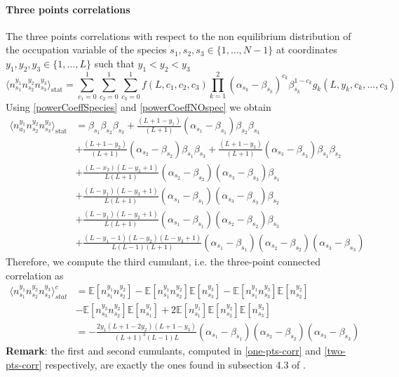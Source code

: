 \documentclass[10pt]{article}
\numberwithin{equation}{section}
\numberwithin{equation}{subsection}
\begin{document}
\paragraph{Three points correlations}
The three points correlations with respect to the non equilibrium distribution of the occupation variable of the species $s_{1},s_{2},s_{3}\in \{1,\ldots,N-1\}$ at coordinates $y_{1},y_{2},y_{3}\in \{1,\ldots,L\}$ such that $y_{1}<y_{2}<y_{3}$
\begin{equation}
    \langle n_{s_{1}}^{y_{1}}n_{s_{2}}^{y_{2}}n_{s_{3}}^{y_{3}}\rangle_{\text{stat}}=\sum_{c_{1}=0}^{1}\sum_{c_{2}=0}^{1}\sum_{c_{3}=0}^{1}f(L,c_{1},c_{2},c_{3})\prod_{k=1}^{2}(\alpha_{s_{k}}-\beta_{s_{k}})^{c_{k}}\beta_{s_{k}}^{1-c_{k}}g_{k}(L,y_{k},c_{k},\ldots,c_{3})
\end{equation}
Using \eqref{powerCoeffSpecies} and \eqref{powerCoeffNOspec} we obtain 
\begin{align}\label{three-pts-corr}
        \langle n_{a_{1}}^{y_{1}}n_{s_{2}}^{y_{2}}n_{s_{3}}^{y_{3}}\rangle_{\text{stat}}&=\beta_{s_{1}}\beta_{s_{2}}\beta_{s_{3}}+\frac{(L+1-y_{1})}{(L+1)}(\alpha_{s_{1}}-\beta_{s_{1}})\beta_{s_{2}}\beta_{s_{3}}
        \\&+\nonumber
        \frac{(L+1-y_{2})}{(L+1)}(\alpha_{s_{2}}-\beta_{s_{2}})\beta_{s_{1}}\beta_{s_{3}}+\frac{(L+1-y_{3})}{(L+1)}(\alpha_{s_{3}}-\beta_{s_{3}})\beta_{s_{1}}\beta_{s_{2}}
        \\&+\nonumber
        \frac{(L-x_{2})(L-y_{3}+1)}{L(L+1)}(\alpha_{s_{2}}-\beta_{s_{2}})(\alpha_{s_{3}}-\beta_{s_{3}})\beta_{s_{1}}
        \\&+\nonumber
        \frac{(L-y_{1})(L-y_{3}+1)}{L(L+1)}(\alpha_{s_{1}}-\beta_{s_{1}})(\alpha_{s_{3}}-\beta_{s_{3}})\beta_{s_{2}}
        \\&+\nonumber
        \frac{(L-y_{1})(L-y_{2}+1)}{L(L+1)}(\alpha_{s_{1}}-\beta_{s_{1}})(\alpha_{s_{2}}-\beta_{s_{2}})\beta_{s_{3}}
        \\&+\nonumber
        \frac{(L-y_{1}-1)(L-y_{2})(L-y_{3}+1)}{L(L-1)(L+1)}(\alpha_{s_{1}}-\beta_{s_{1}})(\alpha_{s_{2}}-\beta_{s_{2}})(\alpha_{s_{3}}-\beta_{s_{3}})
\end{align}
Therefore, we compute the third cumulant, i.e. the three-point connected correlation as 
\begin{align}
	\langle n_{s_{1}}^{y_{1}}n_{s_{2}}^{y_{2}}n_{s_{3}}^{y_{3}}\rangle_{stat}^{c}&=\mathbb{E}\left[n_{s_{1}}^{y_{1}}n_{s_{2}}^{y_{2}}\right]-\mathbb{E}\left[n_{s_{1}}^{y_{1}}n_{s_{2}}^{y_{2}}\right]\mathbb{E}\left[n_{s_{3}}^{y_{3}}\right]-\mathbb{E}\left[n_{s_{1}}^{y_{1}}n_{s_{3}}^{y_{3}}\right]\mathbb{E}\left[n_{s_{2}}^{y_{2}}\right]\\&-\mathbb{E}\left[n_{s_{3}}^{y_{3}}n_{s_{2}}^{y_{2}}\right]\mathbb{E}\left[n_{s_{1}}^{y_{1}}\right]+2\mathbb{E}\left[n_{s_{1}}^{y_{1}}\right]\mathbb{E}\left[n_{s_{2}}^{y_{2}}\right]\mathbb{E}\left[n_{s_{3}}^{y_{3}}\right]
	\\&=
	-\frac{2y_{1}(L+1-2y_{2})(L+1-y_{3})}{(L+1)^{3}(L-1)L}(\alpha_{s_{1}}-\beta_{s_{1}})(\alpha_{s_{2}}-\beta_{s_{2}})(\alpha_{s_{3}}-\beta_{s_{3}})
\end{align}
\textbf{Remark}: the first and second cumulants, computed in \eqref{one-pts-corr} and \eqref{two-pts-corr} respectively, are exactly the ones found in subsection 4.3 of \cite{vanicat2017exact}. 
\end{document}
